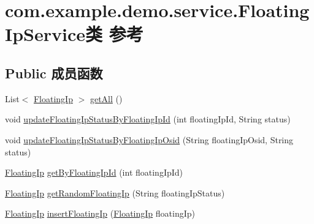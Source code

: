 \hypertarget{classcom_1_1example_1_1demo_1_1service_1_1_floating_ip_service}{}\section{com.\+example.\+demo.\+service.\+Floating\+Ip\+Service类 参考}
\label{classcom_1_1example_1_1demo_1_1service_1_1_floating_ip_service}
\subsection*{Public 成员函数}
\begin{DoxyCompactItemize}
\item 
List$<$ \mbox{\hyperlink{classcom_1_1example_1_1demo_1_1modular_1_1_floating_ip}{Floating\+Ip}} $>$ \mbox{\hyperlink{classcom_1_1example_1_1demo_1_1service_1_1_floating_ip_service_a29371c7b264732371b6bf9b6b581aaec}{get\+All}} ()
\item 
void \mbox{\hyperlink{classcom_1_1example_1_1demo_1_1service_1_1_floating_ip_service_a82754311469907e62aaf0a62b1732f54}{update\+Floating\+Ip\+Status\+By\+Floating\+Ip\+Id}} (int floating\+Ip\+Id, String status)
\item 
void \mbox{\hyperlink{classcom_1_1example_1_1demo_1_1service_1_1_floating_ip_service_a03f92184a7f70ede40e10622cc0c078d}{update\+Floating\+Ip\+Status\+By\+Floating\+Ip\+Osid}} (String floating\+Ip\+Osid, String status)
\item 
\mbox{\hyperlink{classcom_1_1example_1_1demo_1_1modular_1_1_floating_ip}{Floating\+Ip}} \mbox{\hyperlink{classcom_1_1example_1_1demo_1_1service_1_1_floating_ip_service_ab3b01d680415312f816a82b3fbba1e3d}{get\+By\+Floating\+Ip\+Id}} (int floating\+Ip\+Id)
\item 
\mbox{\hyperlink{classcom_1_1example_1_1demo_1_1modular_1_1_floating_ip}{Floating\+Ip}} \mbox{\hyperlink{classcom_1_1example_1_1demo_1_1service_1_1_floating_ip_service_a5660be3786326b94e8b6acda4693c604}{get\+Random\+Floating\+Ip}} (String floating\+Ip\+Status)
\item 
\mbox{\hyperlink{classcom_1_1example_1_1demo_1_1modular_1_1_floating_ip}{Floating\+Ip}} \mbox{\hyperlink{classcom_1_1example_1_1demo_1_1service_1_1_floating_ip_service_a2bd7e4d77eb7a579981267c0c377bbaa}{insert\+Floating\+Ip}} (\mbox{\hyperlink{classcom_1_1example_1_1demo_1_1modular_1_1_floating_ip}{Floating\+Ip}} floating\+Ip)
\end{DoxyCompactItemize}
